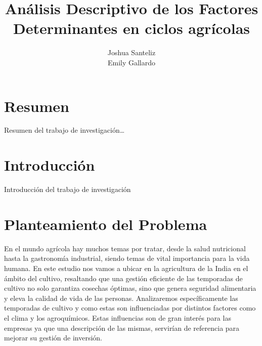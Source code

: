 \documentclass[oneside,11pt]{Latex/Classes/PhDthesisPSnPDF}
\title{Análisis Descriptivo de los Factores Determinantes en ciclos
agrícolas}
\author{Joshua Santeliz \\ Emily Gallardo \\ }
\begin{document}
\maketitle

\frontmatter


\setcounter{secnumdepth}{3}
\setcounter{tocdepth}{3}

\tableofcontents



\cleardoublepage

  \cleardoublepage       %
  \chapter*{Resumen}     %
  
  Resumen del trabajo de
investigación\ldots{}             %
  
  \cleardoublepage

\mainmatter
\def\baselinestretch{1.5}

\chapter*{Introducción}

Introducción del trabajo de investigación

\chapter{Planteamiento del Problema}

En el mundo agrícola hay muchos temas por tratar, desde la salud
nutricional hasta la gastronomía industrial, siendo temas de vital
importancia para la vida humana. En este estudio nos vamos a ubicar en
la agricultura de la India en el ámbito del cultivo, resaltando que una
gestión eficiente de las temporadas de cultivo no solo garantiza
cosechas óptimas, sino que genera seguridad alimentaria y eleva la
calidad de vida de las personas. Analizaremos específicamente las
temporadas de cultivo y como estas son influenciadas por distintos
factores como el clima y los agroquímicos. Estas influencias son de gran
interés para las empresas ya que una descripción de las mismas,
servirían de referencia para mejorar su gestión de inversión.
\end{document}

